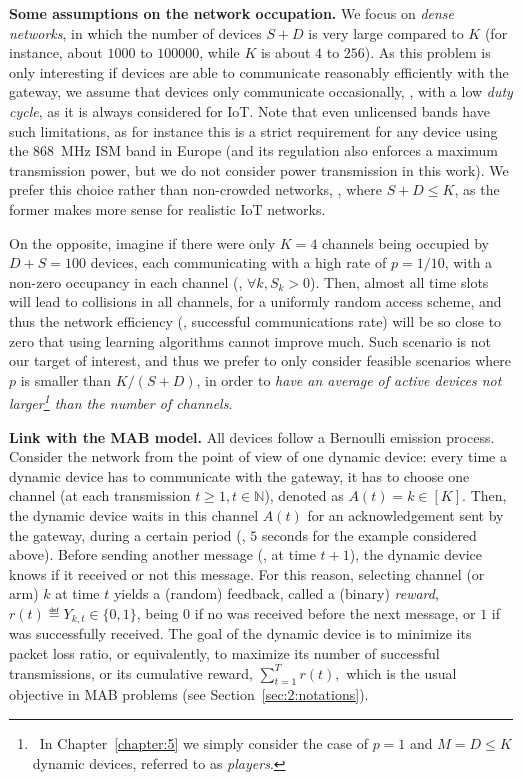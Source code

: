 \textbf{Some assumptions on the network occupation.}
%
We focus on \emph{dense networks}, in which the number of devices $S + D$ is very large compared to $K$ (for instance, about $1000$ to $100000$, while $K$ is about $4$ to $256$).
As this problem is only interesting if devices are able to communicate reasonably efficiently with the gateway, we assume that devices only communicate occasionally, \ie, with a low \emph{duty cycle}, as it is always considered for IoT.
Note that even unlicensed bands have such limitations, as for instance this is a strict requirement for any device using the \SI{868}{\mega\hertz} ISM band in Europe (and its regulation also enforces a maximum transmission power, but we do not consider power transmission in this work).
%
We prefer this choice rather than non-crowded networks, \ie, where $S + D \leq K$, as the former makes more sense for realistic IoT networks.

On the opposite, imagine if there were only $K=4$ channels being occupied by $D+S = 100$ devices, each communicating with a high rate of $p=1/10$, with a non-zero occupancy in each channel (\ie, $\forall k, S_k > 0$). Then, almost all time slots will lead to collisions in all channels, for a uniformly random access scheme, and thus the network efficiency (\ie, successful communications rate) will be so close to zero that using learning algorithms cannot improve much.
Such scenario is not our target of interest, and thus we prefer to only consider feasible scenarios where $p$ is smaller than $K/(S+D)$, in order to \emph{have an average of active devices not larger\footnote{~In Chapter~\ref{chapter:5} we simply consider the case of $p=1$ and $M = D \leq K$ dynamic devices, referred to as \emph{players}.} than the number of channels}.


\textbf{Link with the MAB model.}
%
All devices follow a Bernoulli emission process.
Consider the network from the point of view of one dynamic device:
every time a dynamic device has to communicate with the gateway,
it has to choose one channel (at each transmission $t \geq 1, t \in \mathbb{N}$), denoted as $A(t) = k \in[K]$.
Then, the dynamic device waits in this channel $A(t)$ for an acknowledgement sent by the gateway, during a certain period (\eg, $5$ seconds for the example considered above).
Before sending another message (\ie, at time $t+1$), the dynamic device knows if it received or not this \Ack{} message.
%
For this reason, selecting channel (or arm) $k$ at time $t$ yields a (random) feedback, called a (binary) \emph{reward}, $r(t) \eqdef Y_{k,t} \in \{0,1\}$, being $0$ if no \Ack{} was received before the next message, or $1$ if \Ack{} was successfully received.
The goal of the dynamic device is to minimize its packet loss ratio, or equivalently, to maximize its number of successful transmissions, or its cumulative reward,
$\sum_{t = 1}^T r(t),$
which is the usual objective in MAB problems (see Section~\ref{sec:2:notations}).


